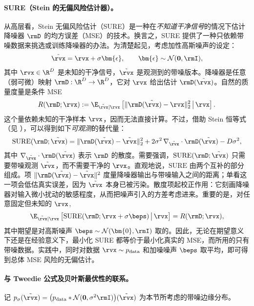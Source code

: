 \paragraph{SURE（Stein 的无偏风险估计器）。}
从高层看，Stein 无偏风险估计（SURE）是一种在\emph{不知道干净信号}的情况下估计降噪器 $\rmD$ 的均方误差（MSE）的技术。换言之，SURE 提供了一种只依赖带噪数据来挑选或训练降噪器的办法。为清楚起见，考虑加性高斯噪声的设定：
\[
\tilde{\rvx} = \rvx + \sigma \bm{\epsilon},
\qquad \bm{\epsilon} \sim \mathcal{N}(\mathbf{0},\rmI),
\]
其中 $\rvx \in \R^D$ 是未知的干净信号，$\tilde{\rvx}$ 是观测到的带噪版本。降噪器是任意（弱可微）映射 $\rmD:\R^D \to \R^D$，它对 $\rvx$ 给出估计 $\rmD(\tilde{\rvx})$。自然的质量度量是条件 MSE
\[
R(\rmD;\rvx) := \E_{\tilde{\rvx}|\rvx}\left[\|\rmD(\tilde{\rvx})-\rvx\|_2^2 \,\big|\, \rvx\right].
\]
这个量依赖未知的干净样本 $\rvx$，因而无法直接计算。不过，借助 Stein 恒等式（见 ），可以得到如下\emph{可观测}的替代量：
\begin{align}\label{eq:sure-obj}
    \mathrm{SURE}(\rmD;\tilde{\rvx})
= \|\rmD(\tilde{\rvx})-\tilde{\rvx}\|_2^2
+ 2\sigma^2\,\nabla_{\tilde{\rvx}}\cdot \rmD(\tilde{\rvx})
- D\sigma^2,
\end{align}
其中 $\nabla_{\tilde{\rvx}}\cdot \rmD(\tilde{\rvx})$ 表示 $\rmD$ 的散度。需要强调，$\mathrm{SURE}(\rmD;\tilde{\rvx})$ 只需要带噪观测 $\tilde\rvx$，而不需要干净的 $\rvx$。直观地说，$\mathrm{SURE}$ 由两个互补的部分组成。项 $\|\rmD(\tilde{\rvx})-\tilde{\rvx}\|^2$ 度量降噪器输出与带噪输入之间的距离；单看这一项会低估真实误差，因为 $\tilde{\rvx}$ 本身已被污染。散度项起校正作用：它刻画降噪器对输入微小扰动的敏感程度，从而把噪声引入的方差考虑进来。重要的是，对任意固定但未知的 $\rvx$,
\[
\E_{\tilde{\rvx}|\rvx}\left[\mathrm{SURE}(\rmD;\rvx+\sigma\beps) \,\big|\, \rvx\right]
= R(\rmD;\rvx),
\]
其中期望是对高斯噪声 $\beps\sim\mathcal{N}(\bm{0},\rmI)$ 取的。因此，无论在期望意义下还是在经验意义下，最小化 SURE 都等价于最小化真实的 MSE，而所用的只有带噪数据。实践中，同时对数据 $\rvx\sim p_{\mathrm{data}}$ 和加噪噪声 $\beps$ 取平均，即可得到总体 MSE 风险的无偏估计。

\paragraph{与 Tweedie 公式及贝叶斯最优性的联系。}
记 $p_\sigma(\tilde{\rvx}) = \big(p_{\mathrm{data}} * \mathcal{N}(\mathbf{0}, \sigma^2 \rmI)\big)(\tilde{\rvx})$ 为本节所考虑的带噪边缘分布。

